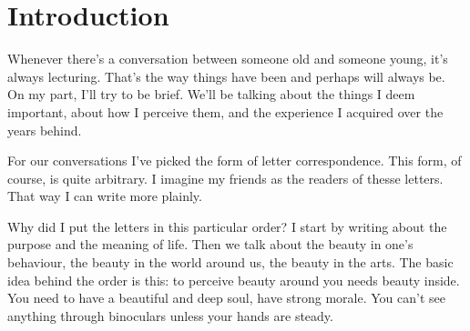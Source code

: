 \chapter*{Introduction}

Whenever there's a conversation between someone old and someone young, it's always lecturing. That's the way things have been and perhaps will always be. On my part, I'll try to be brief. We'll be talking about the things I deem important, about how I perceive them, and the experience I acquired over the years behind.

For our conversations I've picked the form of letter correspondence. This form, of course, is quite arbitrary. I imagine my friends as the readers of thesse letters. That way I can write more plainly.

Why did I put the letters in this particular order? I start by writing about the purpose and the meaning of life. Then we talk about the beauty in one's behaviour, the beauty in the world around us, the beauty in the arts. The basic idea behind the order is this: to perceive beauty around you needs beauty inside. You need to have a beautiful and deep soul, have strong morale. You can't see anything through binoculars unless your hands are steady.